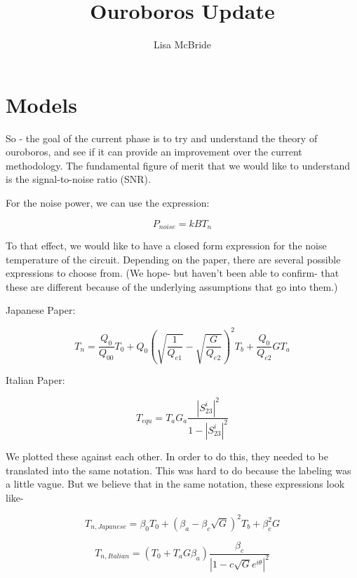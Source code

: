 \documentclass[12pt]{article}
\begin{document}
\title{Ouroboros Update}
\author{Lisa McBride}
\date{}
\maketitle


\section{Models}
So - the goal of the current phase is to try and understand the theory of ouroboros, and see if it can provide an improvement over the current methodology. The fundamental figure of merit that we would like to understand is the signal-to-noise ratio (SNR).

For the noise power, we can use the expression:

\begin{equation}
P_{noise} = kBT_{n}
\end{equation}

To that effect, we would like to have a closed form expression for the noise temperature of the circuit.  Depending on the paper, there are several possible expressions to choose from. (We hope- but haven't been able to confirm- that these are different because of the underlying assumptions that go into them.)

Japanese Paper:
   
\begin{equation}
T_{n} = \frac{Q_{0}}{Q_{00}}T_{0} + Q_{0}(\sqrt{\frac{1}{Q_{e1}}} - \sqrt{\frac{G}{Q_{e2}}})^{2}T_{b} + \frac{Q_{0}}{Q_{e2}} GT_{a}
\end{equation}

Italian Paper:

\begin{equation}
T_{equ} = T_{a}G_{a}\frac{|S^{i}_{23}|^{2}}{1-|S^{i}_{23}|^{2}}
\end{equation}

We plotted these against each other.  In order to do this, they needed to be translated into the same notation. This was hard to do because the labeling was a little vague. But we believe that in the same notation, these expressions look like-

\begin{equation}
T_{n,Japanese} = \beta_{0}T_{0} + (\beta_{a} - \beta_{c}\sqrt{G})^{2}T_{b} + \beta_{c}^{2}G
\end{equation}

\begin{equation}
T_{n,Italian} = (T_{0} + T_{a}G\beta_{a})\frac{\beta_{c}}{|1-c\sqrt{G}e^{i\theta}|^{2}}
\end{equation}
\end{document}
